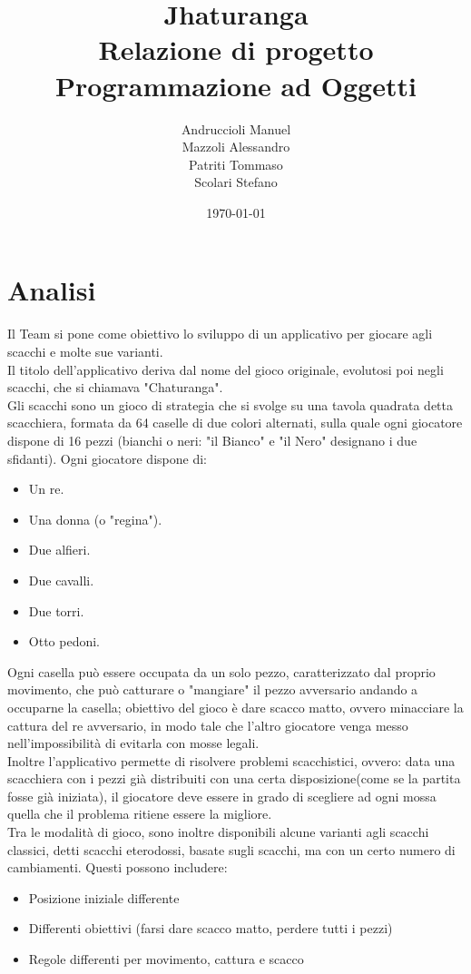 \documentclass[a4paper,12pt]{report}
\title{\textbf{Jhaturanga}\\Relazione di progetto\\Programmazione ad Oggetti}
\author{
Andruccioli Manuel
\\Mazzoli Alessandro
\\Patriti Tommaso
\\Scolari Stefano
}
\date{\today}
\begin{document}
\maketitle

\tableofcontents

\chapter{Analisi}

Il Team si pone come obiettivo lo sviluppo di un applicativo per giocare agli scacchi e molte sue varianti.
\\
Il titolo dell'applicativo deriva dal nome del gioco originale, evolutosi poi negli scacchi, che si chiamava "Chaturanga".
\\
Gli scacchi sono un gioco di strategia che si svolge su una tavola quadrata detta scacchiera, formata da 64 caselle di due colori alternati, sulla quale ogni giocatore dispone di 16 pezzi (bianchi o neri: "il Bianco" e "il Nero" designano i due sfidanti). Ogni giocatore dispone di:
\begin{itemize}
    \item Un re.
    \item Una donna (o "regina").
    \item Due alfieri.
    \item Due cavalli.
    \item Due torri.
    \item Otto pedoni.
\end{itemize}
Ogni casella può essere occupata da un solo pezzo, caratterizzato dal proprio movimento, che può catturare o "mangiare" il pezzo avversario andando a occuparne la casella; obiettivo del gioco è dare scacco matto, ovvero minacciare la cattura del re avversario, in modo tale che l'altro giocatore venga messo nell'impossibilità di evitarla con mosse legali.
\\
Inoltre l'applicativo permette di risolvere problemi scacchistici, ovvero: data una scacchiera con i pezzi già distribuiti con una certa disposizione(come se la partita fosse già iniziata), il giocatore deve essere in grado di scegliere ad ogni mossa quella che il problema ritiene essere la migliore.
\\
Tra le modalità di gioco, sono inoltre disponibili alcune varianti agli scacchi classici, detti scacchi eterodossi, basate sugli scacchi, ma con un certo numero di cambiamenti. Questi possono includere:
\begin{itemize}
    \item Posizione iniziale differente
    \item Differenti obiettivi (farsi dare scacco matto, perdere tutti i pezzi)
    \item Regole differenti per movimento, cattura e scacco
\end{itemize}
\end{document}
